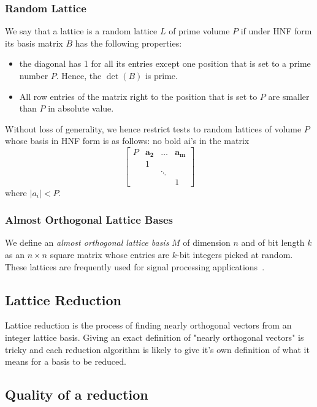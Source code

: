 \documentclass[10pt, a4paper]{article}
\newcommand{\my}[1]{{\color{blue} #1 }}
\renewcommand{\vec}[1]{\mathbf{#1}}
\begin{document}
\subsubsection{Random Lattice}

We say that a lattice is a random lattice $L$ of prime volume $P$ if under HNF form its basis matrix $B$ has the following properties:

\begin{itemize}
\item the diagonal has 1 for all its entries except one position that is set to a prime number $P$. Hence, the $\det(B)$ is prime.
\item All row entries of the matrix right to the position that is set to $P$ are smaller than $P$ in absolute value.
\end{itemize}

Without loss of generality, we hence restrict tests to random lattices of volume $P$ whose basis in HNF form is as follows: \my{no bold ai's in the matrix}
$$\left[\begin{array}{ccccc}
P & \vec{a_2} & \dots & \vec{a_{m}}\\
& 1&   & \\ 
& & \ddots & \\ 
 & & &1 
\end{array}\right]$$
where $|a_i| < P$.

\subsubsection{Almost Orthogonal Lattice Bases}

We define an \emph{almost orthogonal lattice basis} $M$ of dimension $n$ and of bit length $k$ as an $n \times n$ square matrix whose entries are $k$-bit integers picked at random. These lattices are frequently used for signal processing applications~\cite{originalJacobiMethodLatticeBasisReduction}.

\subsection{Lattice Reduction}

Lattice reduction is the process of finding nearly orthogonal vectors from an integer lattice basis. Giving an exact definition of "nearly orthogonal vectors" is tricky and each reduction algorithm is likely to give it's own definition of what it means for a basis to be reduced.

\subsection{Quality of a reduction}
\end{document}

